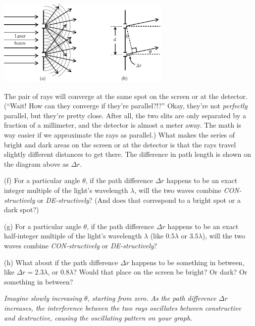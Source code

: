 \vspace{-0.1in}
\begin{center}
\includegraphics[width=0.63\textwidth]{interference_of_light/rays2.eps}
\end{center}
\vspace{-0.2in}

The pair of rays will converge at the same spot on the screen or at the detector.  (``Wait!  How can they converge if they're parallel?!?''  Okay, they're not \textit{perfectly} parallel, but they're pretty close.  After all, the two slits are only separated by a fraction of a millimeter, and the detector is almost a meter away.  The math is way easier if we approximate the rays as parallel.)
What makes the series of bright and dark areas on the screen or at the detector is that the rays travel slightly different distances to get there.  
The difference in path length is shown on the diagram above as $\Delta r$.  

(f) For a particular angle $\theta$, if the path difference $\Delta r$ happens to be an exact integer multiple of the light's wavelength $\lambda$, will the two waves combine \textit{CON-structively} or \textit{DE-structively}?  (And does that correspond to a bright spot or a dark spot?)
\answerspace{0.5in}

(g) For a particular angle $\theta$, if the path difference $\Delta r$ happens to be an exact half-integer multiple of the light's wavelength $\lambda$ (like $0.5\lambda$ or $3.5\lambda$), will the two waves combine \textit{CON-structively} or \textit{DE-structively}?
\answerspace{0.5in}

(h) What about if the path difference $\Delta r$ happens to be something in between, like $\Delta r = 2.3\lambda$, or $0.8\lambda$? Would that place on the screen be bright? Or dark? Or something in between?
\answerspace{0.5in}

\textit{Imagine slowly increasing $\theta$, starting from zero.   As the path difference $\Delta r$ increases, the interference between the two rays oscillates between constructive and destructive, causing the oscillating pattern on your graph.}

